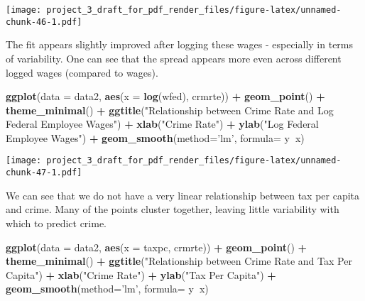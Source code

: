 \documentclass[]{article}
\newenvironment{Shaded}{\begin{snugshade}}{\end{snugshade}}
\newcommand{\DataTypeTok}[1]{\textcolor[rgb]{0.13,0.29,0.53}{#1}}
\newcommand{\KeywordTok}[1]{\textcolor[rgb]{0.13,0.29,0.53}{\textbf{#1}}}
\newcommand{\NormalTok}[1]{#1}
\newcommand{\OperatorTok}[1]{\textcolor[rgb]{0.81,0.36,0.00}{\textbf{#1}}}
\newcommand{\StringTok}[1]{\textcolor[rgb]{0.31,0.60,0.02}{#1}}
\begin{document}
\texttt{[image: project\_3\_draft\_for\_pdf\_render\_files/figure-latex/unnamed-chunk-46-1.pdf]}

The fit appears slightly improved after logging these wages - especially
in terms of variability. One can see that the spread appears more even
across different logged wages (compared to wages).

\begin{Shaded}
\begin{Highlighting}[]
\KeywordTok{ggplot}\NormalTok{(}\DataTypeTok{data =}\NormalTok{ data2, }\KeywordTok{aes}\NormalTok{(}\DataTypeTok{x =} \KeywordTok{log}\NormalTok{(wfed), crmrte)) }\OperatorTok{+}
\StringTok{  }\KeywordTok{geom_point}\NormalTok{() }\OperatorTok{+}
\StringTok{  }\KeywordTok{theme_minimal}\NormalTok{() }\OperatorTok{+}
\StringTok{  }\KeywordTok{ggtitle}\NormalTok{(}\StringTok{"Relationship between Crime Rate and Log Federal Employee Wages"}\NormalTok{) }\OperatorTok{+}\StringTok{ }
\StringTok{  }\KeywordTok{xlab}\NormalTok{(}\StringTok{"Crime Rate"}\NormalTok{) }\OperatorTok{+}\StringTok{ }\KeywordTok{ylab}\NormalTok{(}\StringTok{"Log Federal Employee Wages"}\NormalTok{) }\OperatorTok{+}
\StringTok{  }\KeywordTok{geom_smooth}\NormalTok{(}\DataTypeTok{method=}\StringTok{'lm'}\NormalTok{, }\DataTypeTok{formula=}\NormalTok{ y}\OperatorTok{~}\NormalTok{x)}
\end{Highlighting}
\end{Shaded}

\texttt{[image: project\_3\_draft\_for\_pdf\_render\_files/figure-latex/unnamed-chunk-47-1.pdf]}

We can see that we do not have a very linear relationship between tax
per capita and crime. Many of the points cluster together, leaving
little variability with which to predict crime.

\begin{Shaded}
\begin{Highlighting}[]
\KeywordTok{ggplot}\NormalTok{(}\DataTypeTok{data =}\NormalTok{ data2, }\KeywordTok{aes}\NormalTok{(}\DataTypeTok{x =}\NormalTok{ taxpc, crmrte)) }\OperatorTok{+}
\StringTok{  }\KeywordTok{geom_point}\NormalTok{() }\OperatorTok{+}
\StringTok{  }\KeywordTok{theme_minimal}\NormalTok{() }\OperatorTok{+}
\StringTok{  }\KeywordTok{ggtitle}\NormalTok{(}\StringTok{"Relationship between Crime Rate and Tax Per Capita"}\NormalTok{) }\OperatorTok{+}\StringTok{ }
\StringTok{  }\KeywordTok{xlab}\NormalTok{(}\StringTok{"Crime Rate"}\NormalTok{) }\OperatorTok{+}\StringTok{ }\KeywordTok{ylab}\NormalTok{(}\StringTok{"Tax Per Capita"}\NormalTok{) }\OperatorTok{+}
\StringTok{  }\KeywordTok{geom_smooth}\NormalTok{(}\DataTypeTok{method=}\StringTok{'lm'}\NormalTok{, }\DataTypeTok{formula=}\NormalTok{ y}\OperatorTok{~}\NormalTok{x)}
\end{Highlighting}
\end{Shaded}
\end{document}

